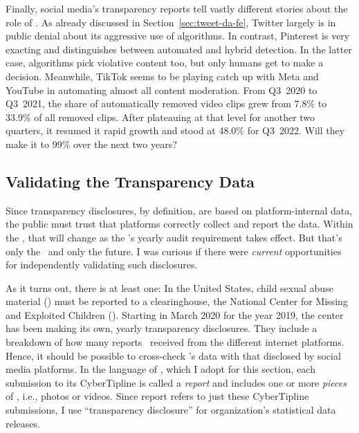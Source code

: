 Finally, social media's transparency reports tell vastly different stories about
the role of \AI. As already discussed in Section~\ref{sec:tweet-da-fe}, Twitter
largely is in public denial about its aggressive use of algorithms. In contrast,
Pinterest is very exacting and distinguishes between automated and hybrid
detection. In the latter case, algorithms pick violative content too, but only
humans get to make a decision. Meanwhile, TikTok seems to be playing catch up
with Meta and YouTube in automating almost all content moderation. From Q3~2020
to Q3~2021, the share of automatically removed video clips grew from 7.8\% to
33.9\% of all removed clips. After plateauing at that level for another two
quarters, it resumed it rapid growth and stood at 48.0\% for Q3~2022. Will they
make it to 99\% over the next two years?


\subsection{Validating the Transparency Data}
\label{sec:census-validation}

Since transparency disclosures, by definition, are based on platform-internal
data, the public must trust that platforms correctly collect and report the
data. Within the \EU, that will change as the \DSA's yearly audit requirement
takes effect. But that's only the \EU\ and only the future. I was curious if
there were \emph{current} opportunities for independently validating such
disclosures.

As it turns out, there is at least one: In the United States, child sexual abuse
material (\CSAM) must be reported to a clearinghouse, the National Center for
Missing and Exploited Children (\NCMEC). Starting in March 2020 for the year
2019, the center has been making its own, yearly transparency disclosures. They
include a breakdown of how many reports \NCMEC\ received from the different
internet platforms. Hence, it should be possible to cross-check \NCMEC's data
with that disclosed by social media platforms. In the language of \NCMEC, which
I adopt for this section, each submission to its CyberTipline is called a
\emph{report} and includes one or more \emph{pieces} of \CSAM, i.e., photos or
videos. Since report refers to just these CyberTipline submissions, I use
``transparency disclosure'' for organization's statistical data releases.

